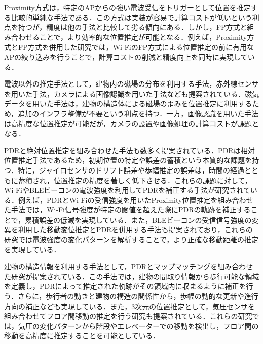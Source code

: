 Proximity方式は，特定のAPからの強い電波受信をトリガーとして位置を推定する比較的単純な手法である．この方式は実装が容易で計算コストが低いという利点を持つが，精度は他の手法と比較して劣る傾向にある．しかし，FP方式と組み合わせることで，より効率的な位置推定が可能となる．例えば，Proximity方式とFP方式を併用した研究\cite{proximity-fingerprint}では，Wi-FiのFP方式による位置推定の前に有用なAPの絞り込みを行うことで，計算コストの削減と精度向上を同時に実現している．

電波以外の推定手法として，建物内の磁場の分布を利用する手法\cite{pdr-mag}，赤外線センサを用いた手法\cite{infrared}，カメラによる画像認識を用いた手法\cite{camera}なども提案されている．磁気データを用いた手法は，建物の構造体による磁場の歪みを位置推定に利用するため，追加のインフラ整備が不要という利点を持つ．一方，画像認識を用いた手法は高精度な位置推定が可能だが，カメラの設置や画像処理の計算コストが課題となる．

PDRと絶対位置推定を組み合わせた手法も数多く提案されている．PDRは相対位置推定手法であるため，初期位置の特定や誤差の蓄積という本質的な課題を持つ．特に，ジャイロセンサのドリフト誤差や歩幅推定の誤差は，時間の経過とともに蓄積され，位置推定の精度を著しく低下させる．これらの課題に対して，Wi-FiやBLEビーコンの電波強度を利用してPDRを補正する手法が研究されている．例えば，PDRとWi-Fiの受信強度を用いたProximity位置推定を組み合わせた手法\cite{pdr-wifi}では，Wi-Fi信号強度が特定の閾値を超えた際にPDRの軌跡を補正することで，累積誤差の低減を実現している．また，BLEビーコンの受信信号強度の変異を利用した移動変位推定とPDRを併用する手法\cite{pdr-ble}も提案されており，これらの研究では電波強度の変化パターンを解析することで，より正確な移動距離の推定を実現している．

建物の構造情報を利用する手法として，PDRとマップマッチングを組み合わせた研究\cite{pdr-map}が提案されている．この手法では，建物の間取り情報から歩行可能な領域を定義し，PDRによって推定された軌跡がその領域内に収まるように補正を行う．さらに，歩行者の動きと建物の構造の関係性から，歩幅の動的な更新や進行方向の補正なども実現している．また，3次元の位置推定として，気圧センサを組み合わせてフロア間移動の推定を行う研究\cite{pdr-wifi}\cite{pdr-stable}も提案されている．これらの研究では，気圧の変化パターンから階段やエレベーターでの移動を検出し，フロア間の移動を高精度に推定することを可能としている．

